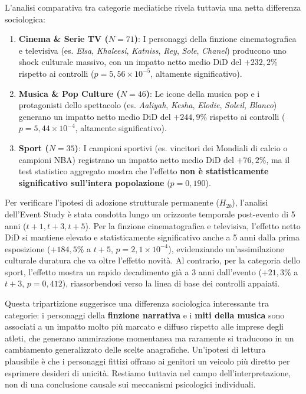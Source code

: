 \documentclass[conference]{IEEEtran}
\begin{document}


L'analisi comparativa tra categorie mediatiche rivela tuttavia una netta differenza sociologica:

\begin{enumerate}
    \item \textbf{Cinema \& Serie TV ($N=71$)}: I personaggi della finzione cinematografica e televisiva 
    (es. \emph{Elsa}, \emph{Khaleesi}, \emph{Katniss}, \emph{Rey}, \emph{Sole}, \emph{Chanel}) 
    producono uno shock culturale massivo, con un impatto netto medio DiD del \textbf{$+232{,}2\%$}
     rispetto ai controlli ($p = 5{,}56 \times 10^{-5}$, altamente significativo).
    \item \textbf{Musica \& Pop Culture ($N=46$)}: Le icone della musica pop e i protagonisti dello 
    spettacolo (es. \emph{Aaliyah}, \emph{Kesha}, \emph{Elodie}, \emph{Soleil}, \emph{Blanco}) 
    generano un impatto netto medio DiD del \textbf{$+244{,}9\%$} rispetto ai controlli 
    ($p = 5{,}44 \times 10^{-4}$, altamente significativo).
    \item \textbf{Sport ($N=35$)}: I campioni sportivi (es. vincitori dei Mondiali di calcio o campioni NBA) 
    registrano un impatto netto medio DiD del $+76{,}2\%$, ma il test statistico aggregato mostra 
    che l'effetto \textbf{non è statisticamente significativo sull'intera popolazione} ($p = 0{,}190$).
\end{enumerate}

Per verificare l'ipotesi di adozione strutturale permanente ($H_{2b}$), l'analisi dell'Event Study è 
stata condotta lungo un orizzonte temporale post-evento di 5 anni ($t+1, t+3, t+5$). Per la finzione 
cinematografica e televisiva, l'effetto netto DiD si mantiene elevato e statisticamente significativo 
anche a 5 anni dalla prima esposizione ($+184{,}5\%$ a $t+5$, $p = 2{,}1 \times 10^{-4}$), evidenziando 
un'assimilazione culturale duratura che va oltre l'effetto novità. Al contrario, per la categoria dello 
sport, l'effetto mostra un rapido decadimento già a 3 anni dall'evento ($+21{,}3\%$ a $t+3$, $p = 0{,}412$), 
riassorbendosi verso la linea di base dei controlli appaiati.

Questa tripartizione suggerisce una differenza sociologica interessante tra categorie: 
i personaggi della \textbf{finzione narrativa} e i \textbf{miti della musica} sono associati a un 
impatto molto più marcato e diffuso rispetto alle imprese degli atleti, che generano ammirazione 
momentanea ma raramente si traducono in un cambiamento generalizzato delle scelte anagrafiche. 
Un'ipotesi di lettura plausibile è che i personaggi fittizi offrano ai genitori un veicolo 
più diretto per esprimere desideri di unicità. 
Restiamo tuttavia nel campo dell'interpretazione, non di una conclusione causale sui meccanismi 
psicologici individuali.
\end{document}
